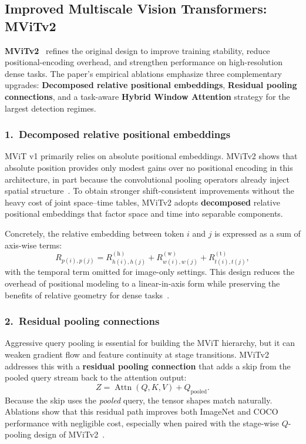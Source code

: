 \subsection{Improved Multiscale Vision Transformers: MViTv2}
\label{sec:mvitv2}

\noindent
\textbf{MViTv2}~\cite{li2021_improved_mvit} refines the original design to improve training stability, reduce positional-encoding overhead, and strengthen performance on high-resolution dense tasks.
The paper’s empirical ablations emphasize three complementary upgrades: \textbf{Decomposed relative positional embeddings}, \textbf{Residual pooling connections}, and a task-aware \textbf{Hybrid Window Attention} strategy for the largest detection regimes.

\subsubsection{1.\ Decomposed relative positional embeddings}
\noindent
MViT v1 primarily relies on absolute positional embeddings.
MViTv2 shows that absolute position provides only modest gains over no positional encoding in this architecture, in part because the convolutional pooling operators already inject spatial structure~\cite{li2021_improved_mvit}.
To obtain stronger shift-consistent improvements without the heavy cost of joint space--time tables, MViTv2 adopts \textbf{decomposed} relative positional embeddings that factor space and time into separable components.

\noindent
Concretely, the relative embedding between token \(i\) and \(j\) is expressed as a sum of axis-wise terms:
\[
R_{p(i), p(j)}
=
R^{(\mathrm{h})}_{h(i), h(j)}
+
R^{(\mathrm{w})}_{w(i), w(j)}
+
R^{(\mathrm{t})}_{t(i), t(j)},
\]
with the temporal term omitted for image-only settings.
This design reduces the overhead of positional modeling to a linear-in-axis form while preserving the benefits of relative geometry for dense tasks~\cite{li2021_improved_mvit}.

\subsubsection{2.\ Residual pooling connections}
\noindent
Aggressive query pooling is essential for building the MViT hierarchy, but it can weaken gradient flow and feature continuity at stage transitions.
MViTv2 addresses this with a \textbf{residual pooling connection} that adds a skip from the pooled query stream back to the attention output:
\[
Z
=
\operatorname{Attn}(Q, K, V)
+
Q_{\text{pooled}}.
\]
Because the skip uses the \emph{pooled} query, the tensor shapes match naturally.
Ablations show that this residual path improves both ImageNet and COCO performance with negligible cost, especially when paired with the stage-wise \(Q\)-pooling design of MViTv2~\cite{li2021_improved_mvit}.

